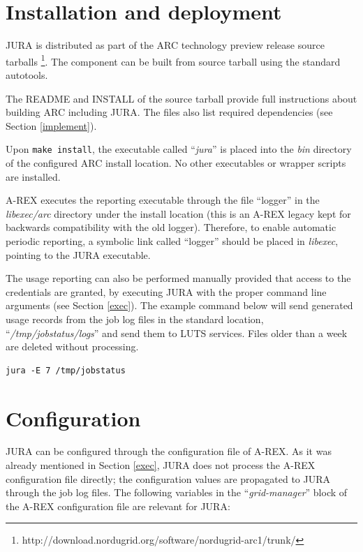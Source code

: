 \documentclass{article}                            %
\begin{document}
\section{Installation and deployment}

JURA is distributed as part of the ARC technology preview release
source tarballs \footnote{http://download.nordugrid.org/software/nordugrid-arc1/trunk/}.
The component can be built from source tarball using the standard autotools.

The README and INSTALL of the source tarball provide full
instructions about building ARC including JURA. The files also list
required dependencies (see Section \ref{implement}).

Upon \verb|make install|, the executable called ``\textit{jura}'' is
placed into the \textit{bin} directory of the configured ARC
install location. No other executables or wrapper scripts are
installed.

A-REX executes the reporting executable through the file ``logger'' in
the \textit{libexec/arc} directory under the install location (this is
an A-REX legacy kept for backwards compatibility with the old
logger). Therefore, to enable automatic periodic reporting, a symbolic
link called ``logger'' should be placed in \textit{libexec}, pointing
to the JURA executable.

The usage reporting can also be performed manually provided that
access to the credentials are granted, by executing JURA with the
proper command line arguments (see Section \ref{exec}). The example
command below will send generated usage records from the job log files
in the standard location, ``\textit{/tmp/jobstatus/logs}'' and send
them to LUTS services. Files older than a week are deleted without
processing.

\begin{verbatim}
jura -E 7 /tmp/jobstatus
\end{verbatim}

\section{Configuration}
\label{config}

JURA can be configured through the configuration file of
A-REX\cite{arex}. As it was already mentioned in Section \ref{exec},
JURA does not process the A-REX configuration file directly; the
configuration values are propagated to JURA through the job log
files. The following variables in the ``\textit{grid-manager}'' block
of the A-REX configuration file are relevant for JURA:
\end{document}
